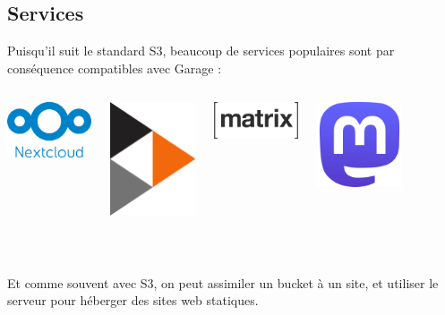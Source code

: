 \documentclass[11pt, aspectratio=1610]{beamer}
\begin{document}
\subsection{Services}
\begin{frame}
\begin{center}
Puisqu'il suit le standard S3, beaucoup de services populaires sont par conséquence compatibles avec Garage :\linebreak

\begin{columns}
\begin{center}
\includegraphics[width=2.5cm]{nextcloud-logo.png}
\end{center}
\begin{center}
\includegraphics[width=2.5cm]{peertube-logo.png}
\end{center}
\begin{center}
\includegraphics[width=2.5cm]{matrix-logo.png}
\end{center}
\begin{center}
\includegraphics[width=2.5cm]{mastodon-logo.png}
\end{center}
\end{columns}
~\linebreak

Et comme souvent avec S3, on peut assimiler un bucket à un site, et utiliser le serveur pour héberger des sites web statiques.
\end{center}
\end{frame}
\end{document}
